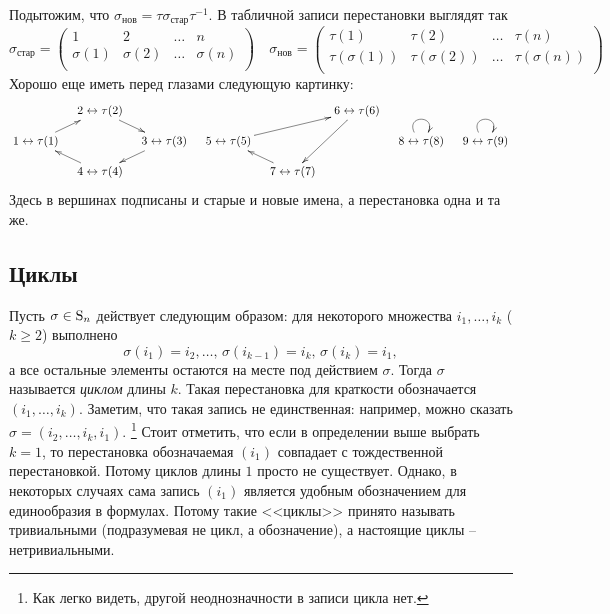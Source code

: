 Подытожим, что $\sigma_\text{нов}=\tau\sigma_\text{стар}\tau^{-1}$.
В табличной записи перестановки выглядят так
\[
\sigma_\text{стар} = 
\begin{pmatrix}
{1}&{2}&{\ldots}&{n}\\
{\sigma(1)}&{\sigma(2)}&{\ldots}&{\sigma(n)}\\
\end{pmatrix}\quad
\sigma_\text{нов} = 
\begin{pmatrix}
{\tau(1)}&{\tau(2)}&{\ldots}&{\tau(n)}\\
{\tau(\sigma(1))}&{\tau(\sigma(2))}&{\ldots}&{\tau(\sigma(n))}\\
\end{pmatrix}
\]
Хорошо еще иметь перед глазами следующую картинку:
\[
\xymatrix@R=10pt@C=10pt{
	{}&{2\leftrightarrow\tau(2)}\ar[dr]&{}&{}&{}&{6\leftrightarrow\tau(6)}\ar[ddl]&{}&{}\\
	{1\leftrightarrow\tau(1)}\ar[ur]&{}&{3\leftrightarrow\tau(3)}\ar[dl]&{5\leftrightarrow\tau(5)}\ar[urr]&{}&{}&{8\leftrightarrow\tau(8)}\ar@(ul,ur)&{9\leftrightarrow\tau(9)}\ar@(ul,ur)\\
	{}&{4\leftrightarrow\tau(4)}\ar[ul]&{}&{}&{7\leftrightarrow\tau(7)}\ar[ul]&{}&{}&{}\\
}
\]
Здесь в вершинах подписаны и старые и новые имена, а перестановка одна и та же.

\subsection{Циклы}

Пусть $\sigma\in \operatorname{S}_{n}$ действует следующим образом: для некоторого множества $i_1,\ldots,i_k$ ($k\geqslant 2$) выполнено 
\[
\sigma(i_1) = i_2,\ldots,\,\sigma(i_{k-1}) = i_k,\,\sigma(i_k) = i_1,
\]
а все остальные элементы остаются на месте под действием $\sigma$.
Тогда $\sigma$ называется {\it циклом} длины $k$.
Такая перестановка для краткости обозначается $(i_1,\ldots,i_k)$.
Заметим, что такая запись не единственная: например, можно сказать $\sigma = (i_2,\ldots,i_k,i_1)$.%
\footnote{Как легко видеть, другой неоднозначности в записи цикла нет.}
Стоит отметить, что если в определении выше выбрать $k=1$, то перестановка обозначаемая $(i_1)$ совпадает с тождественной перестановкой.
Потому циклов длины $1$ просто не существует.
Однако, в некоторых случаях сама запись $(i_1)$ является удобным обозначением для единообразия в формулах.
Потому такие <<циклы>> принято называть тривиальными (подразумевая не цикл, а обозначение), а настоящие циклы -- нетривиальными.

